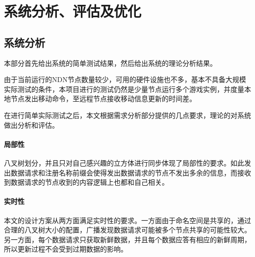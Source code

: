 % 
%
%
% 
%

\chapter{系统分析、评估及优化}
\label{EvaluationChapter}
\section{系统分析}
\setcounter{subsubsection}{0}
\par
本部分首先给出系统的简单测试结果，然后给出系统的理论分析结果。
\par
由于当前运行的NDN节点数量较少，可用的硬件设施也不多，基本不具备大规模实际测试的条件，本项目进行的测试仍然是少量节点运行多个游戏实例，并度量本地节点发出移动命令，至远程节点接收移动信息更新的时间差。
\par
在进行简单实际测试之后，本文根据需求分析部分提供的几点要求，理论的对系统做出分析和评估。
\subsubsection{局部性}
八叉树划分，并且只对自己感兴趣的立方体进行同步体现了局部性的要求。如此发出数据请求和注册名称前缀会使得发出数据请求的节点不发出多余的信息，而接收到数据请求的节点收到的内容逻辑上也都和自己相关。
\subsubsection{实时性}
本文的设计方案从两方面满足实时性的要求。一方面由于命名空间是共享的，通过合理的八叉树大小的配置，广播发现数据请求可能被多个节点共享的可能性较大。另一方面，每个数据请求只获取新鲜数据，并且每个数据应答有相应的新鲜周期，所以更新过程不会受到过期数据的影响。
